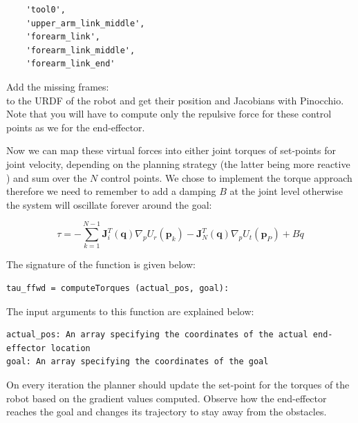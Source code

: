 \documentclass[11pt]{article}
\begin{document}
\begin{verbatim} 
	'tool0', 
	'upper_arm_link_middle', 
	'forearm_link',  
	'forearm_link_middle', 
	'forearm_link_end'
\end{verbatim}

Add the missing frames:\\
to the URDF of the robot and get their position and Jacobians with Pinocchio.
Note that you will have to compute only the repulsive force for these control points as we for the end-effector.

Now we can map these virtual forces into either 
joint torques of set-points for joint velocity, depending on the planning strategy (the latter being more reactive ) 
and sum over the $N$ control points. 
We chose to implement the torque approach  therefore we need to remember 
to add a damping $B$ at the joint level otherwise the system will oscillate forever around the goal:

\begin{equation}
\tau =-\sum_{k=1}^{N-1} \mathbf{J}_{i}^{T}(\mathbf{q}) \nabla_{p} U_{r}\left(\mathbf{p}_{k}\right)-\mathbf{J}_{N}^{T}(\mathbf{q}) \nabla_{p} U_{t}\left(\mathbf{p}_{P}\right)+B \dot{q}
\end{equation}

The signature of the function is given below:
%
\begin{verbatim} 
tau_ffwd = computeTorques (actual_pos, goal):
\end{verbatim}
The input arguments to this function are explained below:
\begin{verbatim} 
actual_pos: An array specifying the coordinates of the actual end-effector location
goal: An array specifying the coordinates of the goal
\end{verbatim}

On every iteration the planner should update the set-point for the  torques of the robot based on the gradient
values computed.  Observe how the end-effector reaches the goal and changes its trajectory to  stay away from  the obstacles. 



\end{document}
